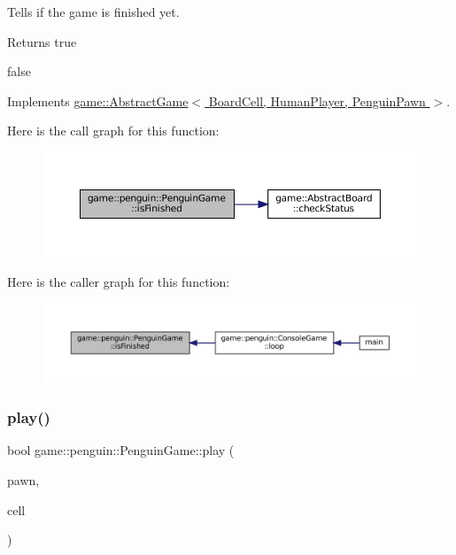 Tells if the game is finished yet. 

\begin{DoxyReturn}{Returns}
true 

false 
\end{DoxyReturn}


Implements \hyperlink{classgame_1_1_abstract_game_a598679eebf40ccc300e9065bce875fd1}{game\+::\+Abstract\+Game$<$ Board\+Cell, Human\+Player, Penguin\+Pawn $>$}.

Here is the call graph for this function\+:
\nopagebreak
\begin{figure}[H]
\begin{center}
\leavevmode
\includegraphics[width=350pt]{classgame_1_1penguin_1_1_penguin_game_ae5e55157da5e8a1ed2ccc2c9cbbad50d_cgraph}
\end{center}
\end{figure}
Here is the caller graph for this function\+:
\nopagebreak
\begin{figure}[H]
\begin{center}
\leavevmode
\includegraphics[width=350pt]{classgame_1_1penguin_1_1_penguin_game_ae5e55157da5e8a1ed2ccc2c9cbbad50d_icgraph}
\end{center}
\end{figure}
\mbox{\label{classgame_1_1penguin_1_1_penguin_game_aa7fe86e287d704d3bc597893134bd408}} 
\subsubsection{\texorpdfstring{play()}{play()}}
{\footnotesize\ttfamily bool game\+::penguin\+::\+Penguin\+Game\+::play (\begin{DoxyParamCaption}\item[{\hyperlink{classgame_1_1penguin_1_1_penguin_pawn}{Penguin\+Pawn} $\ast$}]{pawn,  }\item[{\hyperlink{classgame_1_1penguin_1_1_board_cell}{Board\+Cell} $\ast$}]{cell }\end{DoxyParamCaption})\hspace{0.3cm}{\ttfamily [override]}}

